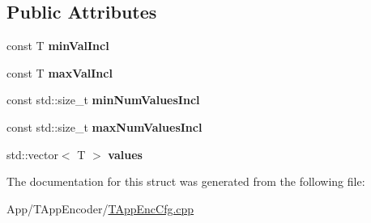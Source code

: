 \subsection*{Public Attributes}
\begin{DoxyCompactItemize}
\item 
\mbox{\label{struct_s_multi_value_input_ad9293d64c0b8fb7a2a77e47c9308a077}} 
const T {\bfseries min\+Val\+Incl}
\item 
\mbox{\label{struct_s_multi_value_input_aa6528b6f8c322ff95768f72b5c22956f}} 
const T {\bfseries max\+Val\+Incl}
\item 
\mbox{\label{struct_s_multi_value_input_a0fc4f1478ce1f57f902573657bd59f82}} 
const std\+::size\+\_\+t {\bfseries min\+Num\+Values\+Incl}
\item 
\mbox{\label{struct_s_multi_value_input_a9b375252d86144e5924056234f384d76}} 
const std\+::size\+\_\+t {\bfseries max\+Num\+Values\+Incl}
\item 
\mbox{\label{struct_s_multi_value_input_ad36d51db01c3ae9e3ca30397e93b7eeb}} 
std\+::vector$<$ T $>$ {\bfseries values}
\end{DoxyCompactItemize}


The documentation for this struct was generated from the following file\+:\begin{DoxyCompactItemize}
\item 
App/\+T\+App\+Encoder/\hyperlink{_t_app_enc_cfg_8cpp}{T\+App\+Enc\+Cfg.\+cpp}\end{DoxyCompactItemize}
